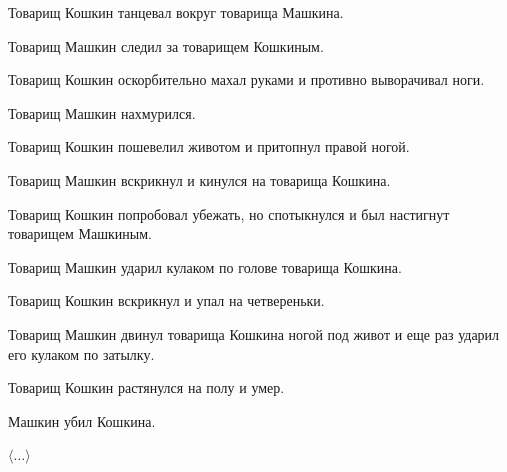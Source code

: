 Товарищ Кошкин танцевал вокруг товарища Машкина.

Товарищ Машкин следил за товарищем Кошкиным.

Товарищ Кошкин оскорбительно махал руками и противно выворачивал ноги.

Товарищ Машкин нахмурился.

Товарищ Кошкин пошевелил животом и притопнул правой ногой.

Товарищ Машкин вскрикнул и кинулся на товарища Кошкина.

Товарищ Кошкин попробовал убежать, но спотыкнулся и был настигнут товарищем Машкиным.

Товарищ Машкин ударил кулаком по голове товарища Кошкина.

Товарищ Кошкин вскрикнул и упал на четвереньки.

Товарищ Машкин двинул товарища Кошкина ногой под живот и еще раз ударил его кулаком по затылку.

Товарищ Кошкин растянулся на полу и умер.

\begin{center}
Машкин убил Кошкина.
\end{center}

\raggedright
\raggedleft $\langle \dots \rangle$\\
